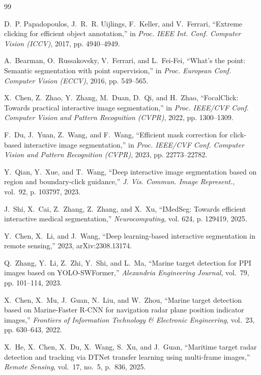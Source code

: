 \documentclass[twocolumn, 10pt]{article}
\begin{document}

\begin{thebibliography}{99}

D.~P. Papadopoulos, J.~R.~R. Uijlings, F.~Keller, and V.~Ferrari, ``Extreme clicking for efficient object annotation,'' in \emph{Proc. IEEE Int. Conf. Computer Vision (ICCV)}, 2017, pp. 4940--4949.

A.~Bearman, O.~Russakovsky, V.~Ferrari, and L.~Fei-Fei, ``What's the point: Semantic segmentation with point supervision,'' in \emph{Proc. European Conf. Computer Vision (ECCV)}, 2016, pp. 549--565.

X.~Chen, Z.~Zhao, Y.~Zhang, M.~Duan, D.~Qi, and H.~Zhao, ``FocalClick: Towards practical interactive image segmentation,'' in \emph{Proc. IEEE/CVF Conf. Computer Vision and Pattern Recognition (CVPR)}, 2022, pp. 1300--1309.

F.~Du, J.~Yuan, Z.~Wang, and F.~Wang, ``Efficient mask correction for click-based interactive image segmentation,'' in \emph{Proc. IEEE/CVF Conf. Computer Vision and Pattern Recognition (CVPR)}, 2023, pp. 22773--22782.

Y.~Qian, Y.~Xue, and T.~Wang, ``Deep interactive image segmentation based on region and boundary-click guidance,'' \emph{J. Vis. Commun. Image Represent.}, vol.~92, p. 103797, 2023.

J.~Shi, X.~Cai, Z.~Zhang, Z.~Zhang, and X.~Xu, ``IMedSeg: Towards efficient interactive medical segmentation,'' \emph{Neurocomputing}, vol. 624, p. 129419, 2025.

Y.~Chen, X.~Li, and J.~Wang, ``Deep learning-based interactive segmentation in remote sensing,'' 2023, arXiv:2308.13174.

Q.~Zhang, Y.~Li, Z.~Zhi, Y.~Shi, and L.~Ma, ``Marine target detection for PPI images based on YOLO-SWFormer,'' \emph{Alexandria Engineering Journal}, vol.~79, pp. 101--114, 2023.

X.~Chen, X.~Mu, J.~Guan, N.~Liu, and W.~Zhou, ``Marine target detection based on Marine-Faster R-CNN for navigation radar plane position indicator images,'' \emph{Frontiers of Information Technology \& Electronic Engineering}, vol.~23, pp. 630--643, 2022.

X.~He, X.~Chen, X.~Du, X.~Wang, S.~Xu, and J.~Guan, ``Maritime target radar detection and tracking via DTNet transfer learning using multi-frame images,'' \emph{Remote Sensing}, vol.~17, no.~5, p.~836, 2025.


\end{thebibliography}
\end{document}
